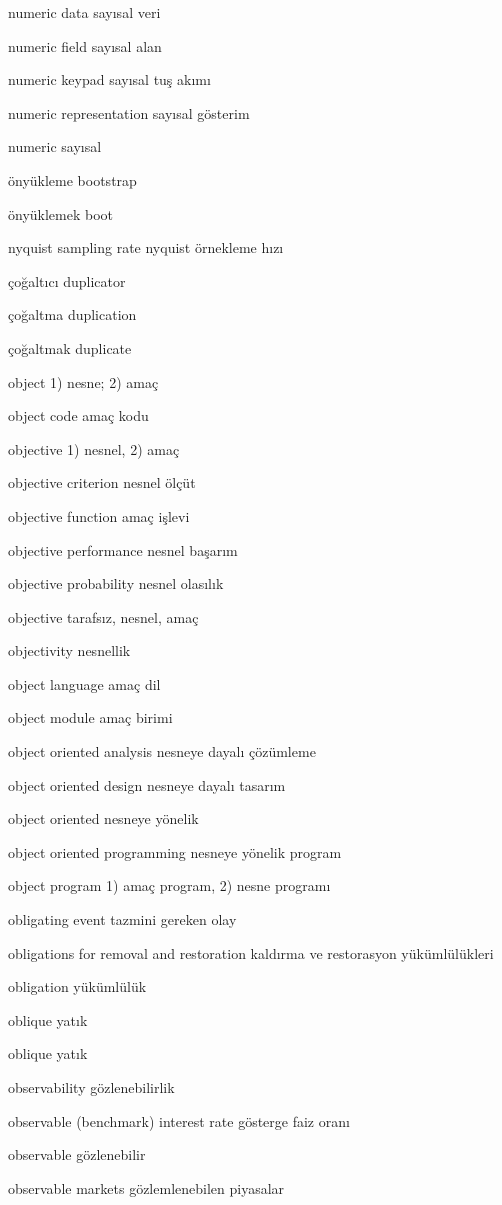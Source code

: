 \documentclass[12pt,fleqn]{article}\usepackage{../../common}
\begin{document}
numeric data sayısal veri

numeric field sayısal alan

numeric keypad sayısal tuş akımı

numeric representation sayısal gösterim

numeric sayısal

önyükleme bootstrap

önyüklemek boot

nyquist sampling rate nyquist örnekleme hızı

çoğaltıcı duplicator

çoğaltma duplication

çoğaltmak duplicate

object 1) nesne; 2) amaç

object code amaç kodu

objective 1) nesnel, 2) amaç

objective criterion nesnel ölçüt

objective function amaç işlevi

objective performance nesnel başarım

objective probability nesnel olasılık

objective tarafsız, nesnel, amaç

objectivity nesnellik

object language amaç dil

object module amaç birimi

object oriented analysis nesneye dayalı çözümleme

object oriented design nesneye dayalı tasarım

object oriented nesneye yönelik

object oriented programming nesneye yönelik program

object program 1) amaç program, 2) nesne programı

obligating event tazmini gereken olay

obligations for removal and restoration kaldırma ve restorasyon yükümlülükleri

obligation yükümlülük

oblique yatık

oblique yatık

observability gözlenebilirlik

observable (benchmark) interest rate gösterge faiz oranı

observable gözlenebilir

observable markets gözlemlenebilen piyasalar
\end{document}
